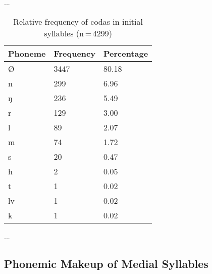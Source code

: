 ...

\begin{table}[hp]\centering
\caption[Relative frequency of codas in initial syllables]{Relative frequency of codas in initial syllables (n\,=\,4299)}
\begin{tabu} to 0.5\textwidth{X X[c] X[c]}
\tableheaderfont\toprule
Phoneme
	& Frequency
	& Percentage
	\\
	
\toprule

Ø	&	3447	&	80.18\pct\\

\midrule

n	&	299	&	6.96\pct\\
ŋ	&	236	&	5.49\pct\\
r	&	129	&	3.00\pct\\
l	&	89	&	2.07\pct\\
m	&	74	&	1.72\pct\\
s	&	20	&	0.47\pct\\
h	&	2	&	0.05\pct\\
t	&	1	&	0.02\pct\\
lv	&	1	&	0.02\pct\\
k	&	1	&	0.02\pct\\

\bottomrule
\end{tabu}
\label{tab:initcod}
\end{table}

...


\subsection{Phonemic Makeup of Medial Syllables}

